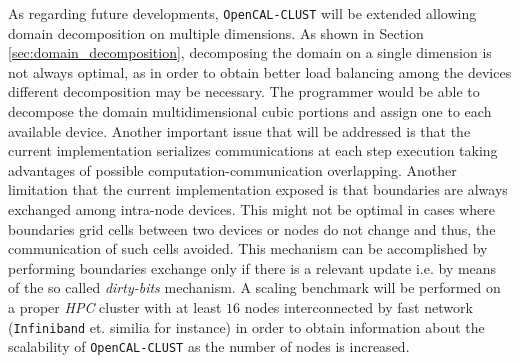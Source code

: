 As regarding future developments, \texttt{OpenCAL-CLUST} will be  extended allowing domain decomposition on multiple dimensions. As shown in Section \ref{sec:domain_decomposition}, decomposing the domain on a single dimension is not always optimal, as in order to obtain better load balancing among the devices different decomposition may be necessary.
The programmer would be able to decompose the domain multidimensional cubic portions and assign one to each available device.
Another important issue that will be addressed is that the current implementation serializes communications at each step execution taking advantages of possible computation-communication overlapping.
Another limitation that the current implementation exposed is that boundaries are always exchanged among intra-node devices. This might not be optimal in cases where boundaries grid cells between two devices or nodes do not change and thus, the communication of such cells avoided. This mechanism can be accomplished by performing boundaries exchange only if there is a relevant update i.e. by means of the so called \textit{dirty-bits} mechanism. 
A scaling benchmark will be performed on a proper \textit{HPC} cluster with at least $16$ nodes interconnected by fast network (\texttt{Infiniband} et. similia for instance) in order to obtain information about the scalability of \texttt{OpenCAL-CLUST} as the number of nodes is increased.

